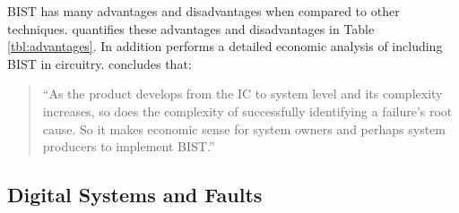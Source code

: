 \documentclass[12pt]{report}
\begin{document}
BIST has many advantages and disadvantages when compared to other techniques.  \cite{stroud} quantifies these advantages and disadvantages in Table \ref{tbl:advantages}.  In addition \cite{ungar} performs a detailed economic analysis of including BIST in circuitry. \cite{ungar} concludes that:
\begin{quote}
``As the product develops from the IC to system level and its complexity increases, so does the complexity of successfully identifying a failure's root cause.  So it makes economic sense for system owners and perhaps system producers to implement BIST.\cite{ungar}''
\end{quote}

\subsection{Digital Systems and Faults}
\end{document}
